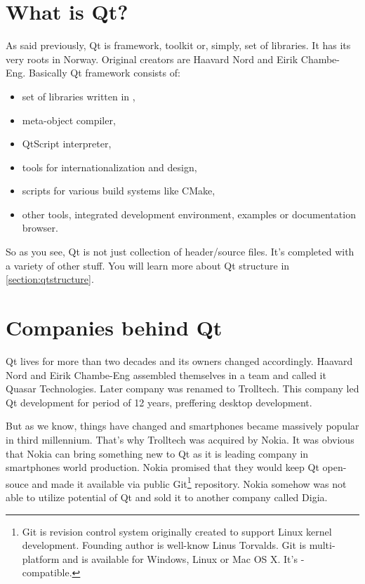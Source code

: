 \vfill

\section{What is Qt?}\label{section:what}
As said previously, Qt is framework, toolkit or, simply, set of libraries. It has its very roots in Norway. Original creators are Haavard Nord and Eirik Chambe-Eng. \citep[section History]{various:qtwikip} Basically Qt framework consists of:
\begin{itemize}
\item set of libraries written in \cpp,
\item meta-object compiler,
\item QtScript interpreter,
\item tools for internationalization and  design,
\item scripts for various build systems like CMake,
\item other tools, \eg integrated development environment, examples or documentation browser.
\end{itemize}

So as you see, Qt is not just collection of header/source files. It's completed with a variety of other stuff. You will learn more about Qt structure in \autoref{section:qtstructure}.

\section{Companies behind Qt}
Qt lives for more than two decades and its owners changed accordingly. Haavard Nord and Eirik Chambe-Eng assembled themselves in a team and called it Quasar Technologies. Later company was renamed to Trolltech. This company led Qt development for period of 12 years, preffering desktop development.


But as we know, things have changed and smartphones became massively popular in third millennium. That's why Trolltech was acquired by Nokia. It was obvious that Nokia can bring something new to Qt as it is leading company in smartphones world production. Nokia promised that they would keep Qt open-souce and made it available via public Git\footnote{Git is revision control system originally created to support Linux kernel development. Founding author is well-know Linus Torvalds. Git is multi-platform and is available for Windows, Linux or Mac OS X. It's -compatible.} repository. Nokia somehow was not able to utilize potential of Qt and sold it to another company called Digia. \citep{various:qtwikip}

